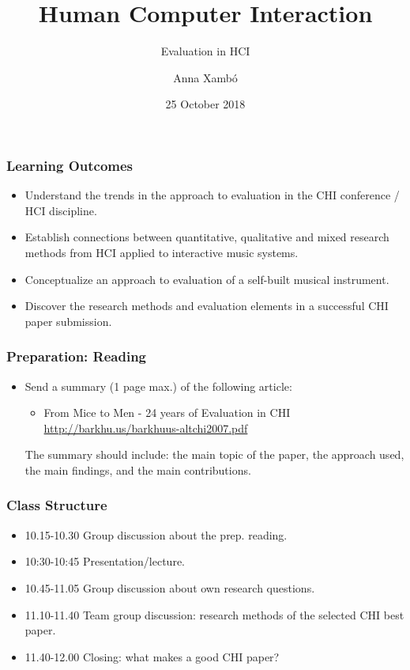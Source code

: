 \documentclass[screen, aspectratio=43]{beamer}
\title[HCI-intro]{Human Computer Interaction}
\subtitle{Evaluation in HCI}
\author[A. Xamb{\'o}]{Anna Xamb{\'o}}
\institute[NTNU]{Department of Music, NTNU}
\date{25 October 2018}
\begin{document}
\begin{frame}
  \titlepage
\end{frame}


\begin{frame}
\frametitle{Learning Outcomes}
\begin{itemize}
\item Understand the trends in the approach to evaluation in the CHI conference / HCI discipline.
\item Establish connections between quantitative, qualitative and mixed research methods from HCI applied to interactive music systems.
\item Conceptualize an approach to evaluation of a self-built musical instrument.
\item Discover the research methods and evaluation elements in a successful CHI paper submission.
\end{itemize}
\end{frame}
%
\begin{frame}
\frametitle{Preparation: Reading}
\begin{itemize}
\item Send a summary (1 page max.) of the following article:
\begin{itemize}
\item From Mice to Men - 24 years of Evaluation in CHI~\cite{Barkhuus.Rode.2007.evalchi}\\
\url{http://barkhu.us/barkhuus-altchi2007.pdf} 
\end{itemize}
The summary should include: the main topic of the paper, the approach used, the main findings, and the main contributions.
\end{itemize}
\end{frame}
%
\begin{frame}
\frametitle{Class Structure}
\begin{itemize}
\item 10.15-10.30 Group discussion about the prep. reading.
\item 10:30-10:45 Presentation/lecture.
\item 10.45-11.05 Group discussion about own research questions.
\item 11.10-11.40 Team group discussion: research methods of the selected CHI best paper.
\item 11.40-12.00 Closing: what makes a good CHI paper? 
\end{itemize}
\end{frame}
\end{document}
